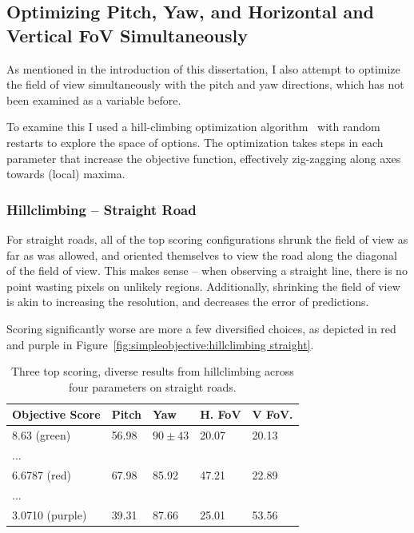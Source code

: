 \documentclass[a4paper,12pt,twoside,openright]{report}
\begin{document}


\subsection{Optimizing Pitch, Yaw, and Horizontal and Vertical FoV Simultaneously}

As mentioned in the introduction of this dissertation, I also attempt
to optimize the field of view simultaneously with the pitch and yaw
directions, which has not been examined as a variable before.

To examine this I used a hill-climbing optimization algorithm~\cite{russel2016artificial}
with random restarts to explore the space of options. The optimization
takes steps in each parameter that increase the objective function, effectively
zig-zagging along axes towards (local) maxima.

\subsubsection{Hillclimbing -- Straight Road}

For straight roads, all of the top scoring configurations 
shrunk the field of view as far as was allowed, and oriented themselves to
view the road along the diagonal of the field of view. This makes sense -- 
when observing a straight line, there is no point wasting pixels
on unlikely regions. Additionally, shrinking the field
of view is akin to increasing the resolution, and decreases
the error of predictions. 

Scoring significantly worse are more a few diversified choices,
as depicted in red and purple in Figure~\ref{fig:simpleobjective:hillclimbing straight}.

\begin{table}[htb]
    \centering
    \caption[Hillclimbing Top Scorers]{Three top scoring, diverse results from hillclimbing across four parameters on straight roads.}
    \label{tab:simpleobjective:hillclimb}
    \begin{tabular}{@{}lllll@{}}
        \toprule
        Objective Score & Pitch & Yaw   & H. FoV & V FoV. \\ \midrule
        8.63 (green)            & 56.98 & $90\pm43$ & 20.07  & 20.13  \\
        ... \\
        6.6787 (red)          & 67.98 & 85.92 & 47.21  & 22.89 \\
        ... \\
        3.0710 (purple)          & 39.31 & 87.66 & 25.01  & 53.56  \\ 
        \bottomrule
    \end{tabular}
\end{table}
\end{document}
